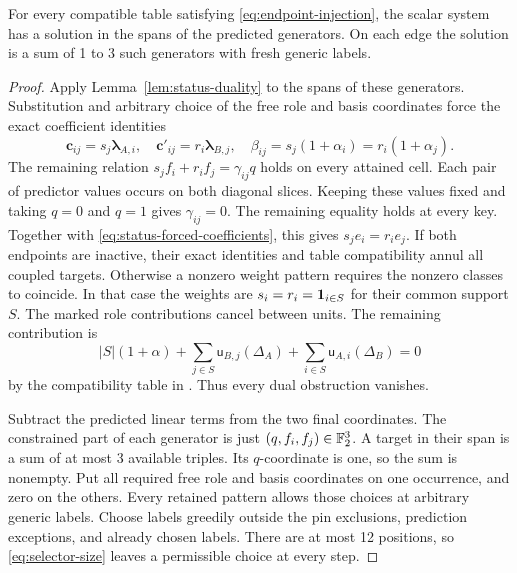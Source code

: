 \begin{lemma}\label{lem:status-predicted}
For every compatible table satisfying \eqref{eq:endpoint-injection},
the scalar system has a solution in the spans of the predicted
generators. On each edge the solution is a sum of 1 to 3 such
generators with fresh generic labels.
\end{lemma}
\begin{proof}
Apply Lemma~\ref{lem:status-duality} to the spans of these generators.
Substitution and arbitrary choice of the free role and basis coordinates
force the exact coefficient identities
\begin{equation}\label{eq:status-forced-coefficients}
 \mathbf c_{ij}=s_j\boldsymbol\lambda_{A,i},\quad
 \mathbf c'_{ij}=r_i\boldsymbol\lambda_{B,j},\quad
 \beta_{ij}=s_j(1+\alpha_i)=r_i(1+\alpha_j).
\end{equation}
The remaining relation \(s_jf_i+r_if_j=\gamma_{ij}q\) holds on every
attained cell. Each pair of predictor values occurs on both diagonal
slices. Keeping these values fixed and taking \(q=0\) and \(q=1\) gives \(\gamma_{ij}=0\).
The remaining equality holds at every key. Together with
\eqref{eq:status-forced-coefficients}, this gives \(s_je_i=r_ie_j\).
If both endpoints are inactive, their exact identities and table compatibility annul
all coupled targets. Otherwise a nonzero weight pattern requires the
nonzero classes to coincide. In that case the weights are
\(s_i=r_i=\mathbf 1_{i\in S}\) for their common support \(S\).
The marked role contributions cancel between units. The remaining
contribution is
\[
 |S|(1+\alpha)+\sum_{j\in S}\mathsf u_{B,j}(\Delta_A)
                  +\sum_{i\in S}\mathsf u_{A,i}(\Delta_B)=0
\]
by the compatibility table in . Thus every dual obstruction vanishes.

Subtract the predicted linear terms from the two final coordinates.
The constrained part of each generator is just \((q,f_i,f_j)\in\mathbb F_2^3\).
A target in their span is a sum of at most 3 available triples.
Its \(q\)-coordinate is one, so the sum is nonempty. Put all required
free role and basis coordinates on one occurrence, and zero on the
others. Every retained pattern allows those choices at arbitrary generic
labels. Choose labels greedily outside the pin exclusions, prediction
exceptions, and already chosen labels. There are at most 12 positions,
so \eqref{eq:selector-size} leaves a permissible choice at every step.
\end{proof}

